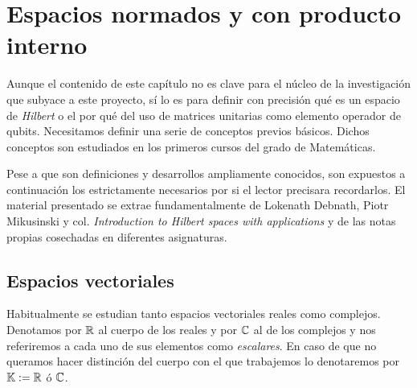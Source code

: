 \chapter{Espacios normados y con producto interno}
\label{chapter2}

Aunque el contenido de este capítulo no es clave para el núcleo de la investigación que subyace a este proyecto, sí lo es para definir con precisión qué es un espacio de \textit{Hilbert} o el por qué del uso de matrices unitarias como elemento operador de qubits. Necesitamos definir una serie de conceptos previos básicos. Dichos conceptos son estudiados en los primeros cursos del grado de Matemáticas.

Pese a que son definiciones y desarrollos ampliamente conocidos, son expuestos a continuación los estrictamente necesarios por si el lector precisara recordarlos. El material presentado se extrae fundamentalmente de Lokenath Debnath, Piotr Mikusinski y col. \textit{Introduction to Hilbert spaces with applications} y de las notas propias cosechadas en diferentes asignaturas.

\section{Espacios vectoriales}

Habitualmente se estudian tanto espacios vectoriales reales como complejos. Denotamos por $\mathbb{R}$ al cuerpo de los reales y por $\mathbb{C}$ al de los complejos y nos referiremos a cada uno de sus elementos como \textit{escalares}. En caso de que no queramos hacer distinción del cuerpo con el que trabajemos lo denotaremos por $\mathbb{K}:=\mathbb{R}$ ó $\mathbb{C}$.

